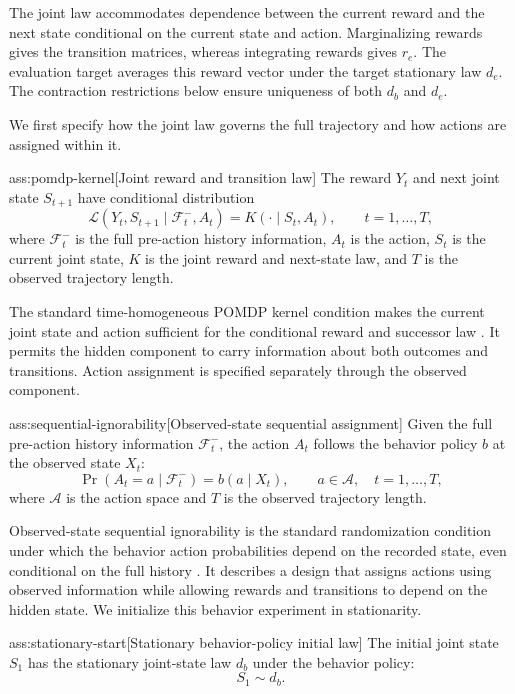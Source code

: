 \documentclass[11pt]{article}
\begin{document}
The joint law accommodates dependence between the current reward and the next state conditional on the current state and action. Marginalizing rewards gives the transition matrices, whereas integrating rewards gives \(r_e\). The evaluation target averages this reward vector under the target stationary law \(d_e\). The contraction restrictions below ensure uniqueness of both \(d_b\) and \(d_e\).

We first specify how the joint law governs the full trajectory and how actions are assigned within it.

\begin{assumptionv}{ass:pomdp-kernel}[Joint reward and transition law]
The reward \(Y_t\) and next joint state \(S_{t+1}\) have conditional distribution
\[
\mathcal L(Y_t,S_{t+1}\mid\mathcal F_t^-,A_t)
=
K(\cdot\mid S_t,A_t),
\qquad t=1,\ldots,T,
\]
where \(\mathcal F_t^-\) is the full pre-action history information, \(A_t\) is the action, \(S_t\) is the current joint state, \(K\) is the joint reward and next-state law, and \(T\) is the observed trajectory length.
\end{assumptionv}

The standard time-homogeneous POMDP kernel condition makes the current joint state and action sufficient for the conditional reward and successor law \citep{HuWager2023}. It permits the hidden component to carry information about both outcomes and transitions. Action assignment is specified separately through the observed component.

\begin{assumptionv}{ass:sequential-ignorability}[Observed-state sequential assignment]
Given the full pre-action history information \(\mathcal F_t^-\), the action \(A_t\) follows the behavior policy \(b\) at the observed state \(X_t\):
\[
\Pr(A_t=a\mid\mathcal F_t^-)=b(a\mid X_t),
\qquad a\in\mathcal A,\quad t=1,\ldots,T,
\]
where \(\mathcal A\) is the action space and \(T\) is the observed trajectory length.
\end{assumptionv}

Observed-state sequential ignorability is the standard randomization condition under which the behavior action probabilities depend on the recorded state, even conditional on the full history \citep{HuWager2023}. It describes a design that assigns actions using observed information while allowing rewards and transitions to depend on the hidden state. We initialize this behavior experiment in stationarity.

\begin{assumptionv}{ass:stationary-start}[Stationary behavior-policy initial law]
The initial joint state \(S_1\) has the stationary joint-state law \(d_b\) under the behavior policy:
\[
S_1\sim d_b.
\]
\end{assumptionv}
\end{document}

